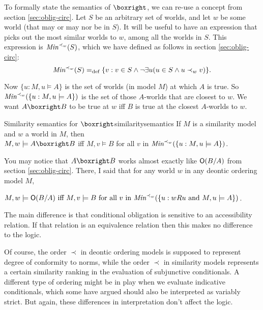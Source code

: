 To formally state the semantics of $\boxright$, we can re-use a concept from
section \ref{sec:oblig-circ}. Let $S$ be an arbitrary set of worlds, and let $w$
be some world (that may or may nor be in $S$). It will be useful to have an
expression that picks out the most similar worlds to $w$, among all the worlds in
$S$. This expression is $\emph{Min}^{\prec_w}(S)$, which we have defined as follows in
section \ref{sec:oblig-circ}:
\[
  \emph{Min}^{\prec_w}(S) =_\text{def} \{ v: v \in S \land \neg\exists u (u \in S \land u \prec_w v) \}.
\]

Now $\{ u : M,u\models A \}$ is the set of worlds (in model $M$) at which $A$ is
true. So $\emph{Min}^{\prec_w}(\{ u : M,u\models A \})$ is the set of those
$A$-worlds that are closest to $w$. We want $A \boxright B$ to be true at $w$
iff $B$ is true at the closest $A$-worlds to $w$.

\begin{definition}{Similarity semantics for $\boxright$}{similaritysemantics}
  If $M$ is a similarity model and $w$ a world in $M$, then\\[1mm]
  $M,w \models A \boxright B$ iff $M,v \models B$ for all
  $v$ in $\emph{Min}^{\prec_w}(\{ u: M,u \models A \})$.
\end{definition}

You may notice that $A \boxright B$ works almost exactly like $\operatorname{\mathsf{O}}(B/A)$ from
section \ref{sec:oblig-circ}. There, I said that for any world $w$ in any deontic
ordering model $M$,

\medskip
\quad$M,w \models \Ob (B/A) \text{ iff } M,v \models B\text{ for all $v$ in $\emph{Min}^{\prec_w}(\{ u: wRu $ and $M,u\models A \})$}$.

\medskip \noindent%
The main difference is that conditional obligation is sensitive to an
accessibility relation. If that relation is an equivalence relation then this
makes no difference to the logic.


Of course, the order $\prec$ in deontic ordering models is supposed to represent
degree of conformity to norms, while the order $\prec$ in similarity models
represents a certain similarity ranking in the evaluation of subjunctive
conditionals. A different type of ordering might be in play when we evaluate
indicative conditionals, which some have argued should also be interpreted as
variably strict. But again, these differences in interpretation don't affect the
logic.


